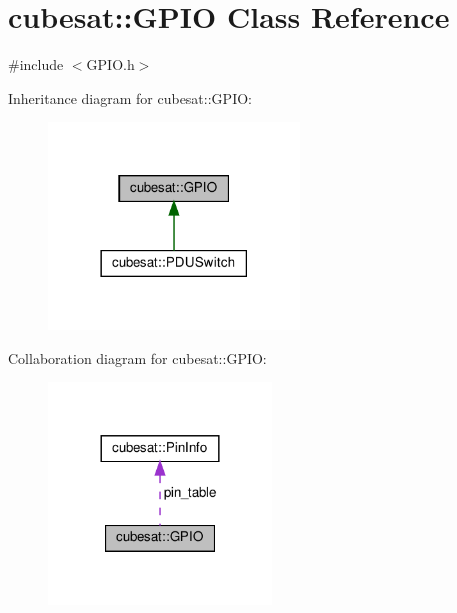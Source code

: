 \hypertarget{classcubesat_1_1GPIO}{}\section{cubesat\+:\+:G\+P\+IO Class Reference}
\label{classcubesat_1_1GPIO}


{\ttfamily \#include $<$G\+P\+I\+O.\+h$>$}



Inheritance diagram for cubesat\+:\+:G\+P\+IO\+:\nopagebreak
\begin{figure}[H]
\begin{center}
\leavevmode
\includegraphics[width=189pt]{classcubesat_1_1GPIO__inherit__graph}
\end{center}
\end{figure}


Collaboration diagram for cubesat\+:\+:G\+P\+IO\+:\nopagebreak
\begin{figure}[H]
\begin{center}
\leavevmode
\includegraphics[width=168pt]{classcubesat_1_1GPIO__coll__graph}
\end{center}
\end{figure}
